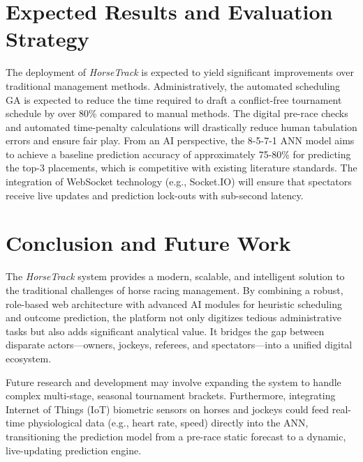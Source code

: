 \documentclass{llncs}
\begin{document}
\section{Expected Results and Evaluation Strategy}
The deployment of \textit{HorseTrack} is expected to yield significant improvements over traditional management methods. 
Administratively, the automated scheduling GA is expected to reduce the time required to draft a conflict-free tournament schedule by over 80\% compared to manual methods. The digital pre-race checks and automated time-penalty calculations will drastically reduce human tabulation errors and ensure fair play.
From an AI perspective, the 8-5-7-1 ANN model aims to achieve a baseline prediction accuracy of approximately 75-80\% for predicting the top-3 placements, which is competitive with existing literature standards. The integration of WebSocket technology (e.g., Socket.IO) will ensure that spectators receive live updates and prediction lock-outs with sub-second latency.

\section{Conclusion and Future Work}
The \textit{HorseTrack} system provides a modern, scalable, and intelligent solution to the traditional challenges of horse racing management. By combining a robust, role-based web architecture with advanced AI modules for heuristic scheduling and outcome prediction, the platform not only digitizes tedious administrative tasks but also adds significant analytical value. It bridges the gap between disparate actors—owners, jockeys, referees, and spectators—into a unified digital ecosystem.

Future research and development may involve expanding the system to handle complex multi-stage, seasonal tournament brackets. Furthermore, integrating Internet of Things (IoT) biometric sensors on horses and jockeys could feed real-time physiological data (e.g., heart rate, speed) directly into the ANN, transitioning the prediction model from a pre-race static forecast to a dynamic, live-updating prediction engine.
\end{document}
